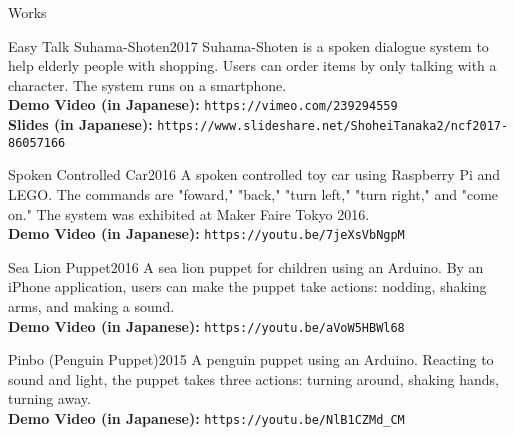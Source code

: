 \documentclass{resume} %
\begin{document}

\begin{rSection}{Works}

\begin{rSubsection}{Easy Talk Suhama-Shoten}{2017}{}{}
Suhama-Shoten is a spoken dialogue system to help elderly people with shopping.
Users can order items by only talking with a character. 
The system runs on a smartphone.
\\{\bf Demo Video (in Japanese):} \texttt{https://vimeo.com/239294559}
\\{\bf Slides (in Japanese):} \texttt{https://www.slideshare.net/ShoheiTanaka2/ncf2017-86057166}
\end{rSubsection}


\begin{rSubsection}{Spoken Controlled Car}{2016}{}{}
A spoken controlled toy car using Raspberry Pi and LEGO.
The commands are "foward," "back," "turn left," "turn right," and "come on."
The system was exhibited at Maker Faire Tokyo 2016.
\\{\bf Demo Video (in Japanese):} \texttt{https://youtu.be/7jeXsVbNgpM}
\end{rSubsection}

\begin{rSubsection}{Sea Lion Puppet}{2016}{}{}
A sea lion puppet for children using an Arduino.
By an iPhone application, users can make the puppet take actions: nodding, shaking arms, and making a sound.
\\{\bf Demo Video (in Japanese):} \texttt{https://youtu.be/aVoW5HBWl68}
\end{rSubsection}

\begin{rSubsection}{Pinbo (Penguin Puppet)}{2015}{}{}
A penguin puppet using an Arduino.
Reacting to sound and light, the puppet takes three actions: turning around, shaking hands, turning away.
\\{\bf Demo Video (in Japanese):} \texttt{https://youtu.be/NlB1CZMd\_CM}
\end{rSubsection}

\end{rSection}
\end{document}
